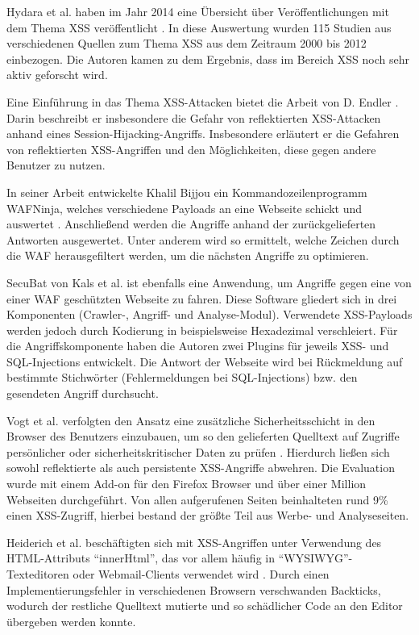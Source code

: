 Hydara et al. haben im Jahr 2014 eine Übersicht über Veröffentlichungen mit dem Thema \ac{XSS} veröffentlicht \cite{Hydara2015a}. In diese Auswertung wurden 115 Studien aus verschiedenen Quellen zum Thema \ac{XSS} aus dem Zeitraum 2000 bis 2012 einbezogen. Die Autoren kamen zu dem Ergebnis, dass im Bereich \ac{XSS} noch sehr aktiv geforscht wird.

Eine Einführung in das Thema \ac{XSS}-Attacken bietet die Arbeit von D. Endler \cite{Endler2002}. Darin beschreibt er insbesondere die Gefahr von reflektierten \ac{XSS}-Attacken anhand eines Session-Hijacking-Angriffs. Insbesondere erläutert er die Gefahren von reflektierten \ac{XSS}-Angriffen und den Möglichkeiten, diese gegen andere Benutzer zu nutzen.

In seiner Arbeit entwickelte Khalil Bijjou ein Kommandozeilenprogramm WAFNinja, welches verschiedene Payloads an eine Webseite schickt und auswertet \cite{Bijjou2015}. Anschließend werden die Angriffe anhand der zurückgelieferten Antworten ausgewertet. Unter anderem wird so ermittelt, welche Zeichen durch die \ac{WAF} herausgefiltert werden, um die nächsten Angriffe zu optimieren.

SecuBat \cite{Kals2006} von Kals et al. ist ebenfalls eine Anwendung, um Angriffe gegen eine von einer \ac{WAF} geschützten Webseite zu fahren. Diese Software gliedert sich in drei Komponenten (\gls{Crawler}-, Angriff- und Analyse-Modul). Verwendete \ac{XSS}-Payloads werden jedoch durch Kodierung in beispielsweise Hexadezimal verschleiert. Für die Angriffskomponente haben die Autoren zwei Plugins für jeweils \ac{XSS}- und SQL-Injections entwickelt. Die Antwort der Webseite wird bei Rückmeldung auf bestimmte Stichwörter (Fehlermeldungen bei SQL-Injections) bzw. den gesendeten Angriff durchsucht.

Vogt et al. verfolgten den Ansatz eine zusätzliche Sicherheitsschicht in den Browser des Benutzers einzubauen, um so den gelieferten Quelltext auf Zugriffe persönlicher oder sicherheitskritischer Daten zu prüfen \cite{Vogt2007}. Hierdurch ließen sich sowohl reflektierte als auch persistente \ac{XSS}-Angriffe abwehren. Die Evaluation wurde mit einem Add-on für den Firefox Browser und über einer Million Webseiten durchgeführt. Von allen aufgerufenen Seiten beinhalteten rund 9\% einen \ac{XSS}-Zugriff, hierbei bestand der größte Teil aus Werbe- und Analyseseiten.

Heiderich et al. beschäftigten sich mit \ac{XSS}-Angriffen unter Verwendung des HTML-Attributs ``innerHtml'', das vor allem häufig in ``\acs{WYSIWYG}''-Texteditoren oder Webmail-Clients verwendet wird \cite{Heiderich2013}. Durch einen Implementierungsfehler in verschiedenen Browsern verschwanden \gls{Backtick}s, wodurch der restliche Quelltext mutierte und so schädlicher Code an den Editor übergeben werden konnte.

